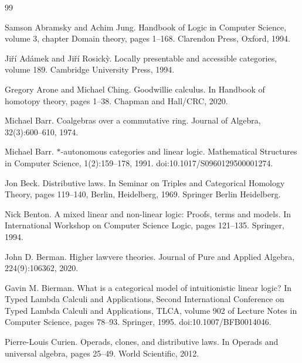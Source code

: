 \begin{thebibliography}{99}
\par\noindent    Samson Abramsky and Achim Jung.  Handbook of Logic in Computer Science, volume 3, chapter Domain theory, pages 1–168.  Clarendon Press, Oxford, 1994.  

\par\noindent    Jiří Adámek and Jiří Rosickỳ.  Locally presentable and accessible categories, volume 189.  Cambridge University Press, 1994.  

\par\noindent    Gregory Arone and Michael Ching.  Goodwillie calculus.  In Handbook of homotopy theory, pages 1–38. Chapman and Hall/CRC, 2020.  

\par\noindent    Michael Barr.  Coalgebras over a commutative ring.  Journal of Algebra, 32(3):600–610, 1974.  

\par\noindent    Michael Barr.  $*$-autonomous categories and linear logic.  Mathematical Structures in Computer Science, 1(2):159–178, 1991.  doi:10.1017/S0960129500001274.  

\par\noindent    Jon Beck.  Distributive laws.  In Seminar on Triples and Categorical Homology Theory, pages 119–140, Berlin, Heidelberg, 1969. Springer Berlin Heidelberg.  

\par\noindent    Nick Benton.  A mixed linear and non-linear logic: Proofs, terms and models.  In International Workshop on Computer Science Logic, pages 121–135. Springer, 1994.  

\par\noindent    John D. Berman.  Higher lawvere theories.  Journal of Pure and Applied Algebra, 224(9):106362, 2020.  

\par\noindent    Gavin M. Bierman.  What is a categorical model of intuitionistic linear logic?  In Typed Lambda Calculi and Applications, Second International Conference on Typed Lambda Calculi and Applications, TLCA, volume 902 of Lecture Notes in Computer Science, pages 78–93. Springer, 1995.  doi:10.1007/BFB0014046.  

\par\noindent    Pierre-Louis Curien.  Operads, clones, and distributive laws.  In Operads and universal algebra, pages 25–49. World Scientific, 2012.  


\end{thebibliography}
